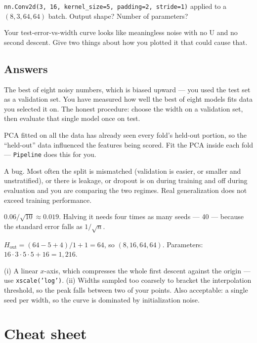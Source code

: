 \documentclass[11pt]{article}
\begin{document}
 \texttt{nn.Conv2d(3, 16, kernel\_size=5, padding=2, stride=1)} applied
to a $(8, 3, 64, 64)$ batch. Output shape? Number of parameters?

 Your test-error-vs-width curve looks like meaningless noise with no U
and no second descent. Give two things about how you plotted it that could
cause that.

\subsection*{Answers}

 The best of eight noisy numbers, which is biased upward --- you used the
test set as a validation set. You have measured how well the best of eight
models fits data you selected it on. The honest procedure: choose the width on a
validation set, then evaluate that single model once on test.

 PCA fitted on all the data has already seen every fold's held-out
portion, so the ``held-out'' data influenced the features being scored. Fit the
PCA inside each fold --- \texttt{Pipeline} does this for you.

 A bug. Most often the split is mismatched (validation is easier, or
smaller and unstratified), or there is leakage, or dropout is on during training
and off during evaluation and you are comparing the two regimes. Real
generalization does not exceed training performance.

 $0.06/\sqrt{10} \approx 0.019$. Halving it needs four times as many
seeds --- 40 --- because the standard error falls as $1/\sqrt{n}$.

 $H_{\text{out}} = (64 - 5 + 4)/1 + 1 = 64$, so $(8, 16, 64, 64)$.
Parameters: $16 \cdot 3 \cdot 5 \cdot 5 + 16 = 1{,}216$.

 (i) A linear $x$-axis, which compresses the whole first descent against
the origin --- use \texttt{xscale('log')}. (ii) Widths sampled too coarsely to
bracket the interpolation threshold, so the peak falls between two of your
points. Also acceptable: a single seed per width, so the curve is dominated by
initialization noise.

\section*{Cheat sheet}
\end{document}
